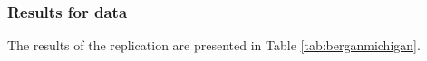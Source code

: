 \documentclass[12pt]{article}
\begin{document}
\subsubsection{Results for \citet{bergan2015call} data}

The results of the \citet{butler2011can} replication are presented in Table \ref{tab:berganmichigan}. 

\end{document}

